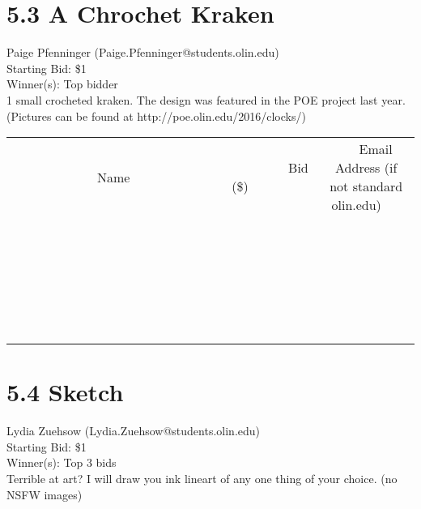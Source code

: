 \documentclass[11pt]{article}
\begin{document}
\section*{5.3 A Chrochet Kraken}
Paige Pfenninger (Paige.Pfenninger@students.olin.edu) \\
Starting Bid: \$1 \\
Winner(s): 
Top bidder \\
1 small crocheted kraken. The design was featured in the POE project last year. (Pictures can be found at http://poe.olin.edu/2016/clocks/) \\[6ex]
\begin{tabular}{c c c}
~~~~~~~~~~~~~Name~~~~~~~~~~~~~ & ~~~~~~~~~Bid (\$)~~~~~~~~~ & ~~~Email Address (if not standard olin.edu)~~~ \\
 & & \\
\hline
 & & \\
\hline
 & & \\
\hline
 & & \\
\hline
 & & \\
\hline
 & & \\
\hline
 & & \\
\hline
 & & \\
\hline
 & & \\
\hline
 & & \\
\hline
 & & \\
\hline
 & & \\
\hline
 & & \\
\hline
 & & \\
\hline
 & & \\
\hline
 & & \\
\hline
 & & \\
\hline
 & & \\
\hline
 & & \\
\hline
 & & \\
\hline
 & & \\
\hline
 & & \\
\hline
 & & \\
\hline
 & & \\
\hline
 & & \\
\hline
 & & \\
\hline
\end{tabular}
\clearpage
\section*{5.4 Sketch}
Lydia Zuehsow (Lydia.Zuehsow@students.olin.edu) \\
Starting Bid: \$1 \\
Winner(s): 
Top 3 bids \\
Terrible at art?
I will draw you ink lineart of any one thing of your choice.
(no NSFW images)
\end{document}
